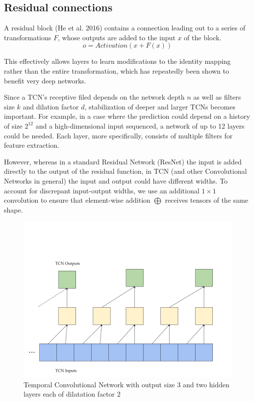 \subsection{Residual connections}
A residual block (He et al. 2016) \cite{residual_connections} contains a connection leading out to a series of transformations $F$, whose outputs are added to the input $x$ of the block.
$$ o = Activation(x+F(x))$$

This effectively allows layers to learn modifications to the identity mapping rather than the entire transformation, which has repeatedly been shown to benefit very deep networks.

\hfill \break

Since a TCN's receptive filed depends on the network depth $n$ as well as filters size $k$ and dilation factor $d$, stabilization of deeper and larger TCNs becomes important. For example, in a case where the prediction could depend on a history of size $2^{12}$ and a high-dimensional input sequenced, a network of up to 12 layers could be needed. Each layer, more specifically, consists of multiple filters for feature extraction. 

\hfill \break

However, whereas in a standard Residual Network (ResNet) the input is added directly to the output of the residual function, in TCN (and other Convolutional Networks in general) the input and output could have different widths. To account for discrepant input-output widths, we use an additional $1 \times 1$ convolution to ensure that element-wise addition $\bigoplus$ receives tensors of the same shape.



\begin{figure}
    \centering
    \includegraphics[width=13cm]{cap3/TCN.png}
    \caption[Temporal convolutional Network diagram]{Temporal Convolutional Network with output size 3 and two hidden layers each of dilatation factor 2}
    \label{fig:tcn}
\end{figure}

